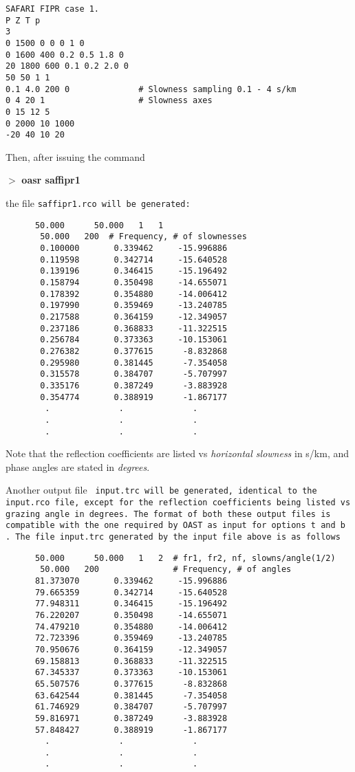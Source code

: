 \begin{verbatim}
SAFARI FIPR case 1.
P Z T p
3
0 1500 0 0 0 1 0
0 1600 400 0.2 0.5 1.8 0
20 1800 600 0.1 0.2 2.0 0
50 50 1 1
0.1 4.0 200 0              # Slowness sampling 0.1 - 4 s/km
0 4 20 1                   # Slowness axes
0 15 12 5
0 2000 10 1000
-20 40 10 20
\end{verbatim}

Then, after issuing the command

$>$ {\bf oasr saffipr1}

\noindent the file \tt saffipr1.rco \rm will be generated:

\begin{verbatim}
      50.000      50.000   1   1
       50.000   200  # Frequency, # of slownesses
       0.100000       0.339462     -15.996886
       0.119598       0.342714     -15.640528
       0.139196       0.346415     -15.196492
       0.158794       0.350498     -14.655071
       0.178392       0.354880     -14.006412
       0.197990       0.359469     -13.240785
       0.217588       0.364159     -12.349057
       0.237186       0.368833     -11.322515
       0.256784       0.373363     -10.153061
       0.276382       0.377615      -8.832868
       0.295980       0.381445      -7.354058
       0.315578       0.384707      -5.707997
       0.335176       0.387249      -3.883928
       0.354774       0.388919      -1.867177
        .              .              .
        .              .              .
        .              .              .
\end{verbatim}

\noindent Note that the reflection coefficients are listed vs {\em
horizontal  slowness} in s/km, and phase angles are stated in {\em degrees}.

\label{trc-form}
Another output file \tt
input.trc \rm  will be generated, identical to the \tt input.rco \rm
file, except for the reflection coefficients being listed vs grazing
angle in degrees.
The format of both these output files
 is compatible with the one required by \tt OAST \rm as input for
options \tt t \rm and \tt b \rm. The file \tt input.trc \rm generated by
the input file above is as follows

\begin{verbatim}
      50.000      50.000   1   2  # fr1, fr2, nf, slowns/angle(1/2)
       50.000   200               # Frequency, # of angles
      81.373070       0.339462     -15.996886
      79.665359       0.342714     -15.640528
      77.948311       0.346415     -15.196492
      76.220207       0.350498     -14.655071
      74.479210       0.354880     -14.006412
      72.723396       0.359469     -13.240785
      70.950676       0.364159     -12.349057
      69.158813       0.368833     -11.322515
      67.345337       0.373363     -10.153061
      65.507576       0.377615      -8.832868
      63.642544       0.381445      -7.354058
      61.746929       0.384707      -5.707997
      59.816971       0.387249      -3.883928
      57.848427       0.388919      -1.867177
        .              .              .
        .              .              .
        .              .              .
\end{verbatim} 

